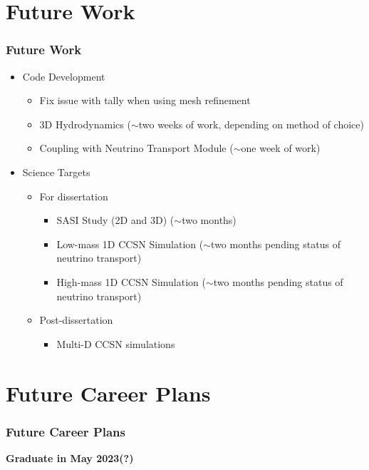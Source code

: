 \documentclass{beamer}
\begin{document}
\section{Future Work}

\begin{frame}
\frametitle{Future Work}

\begin{itemize}
  \item Code Development
  \begin{itemize}
    \item Fix issue with tally when using mesh refinement
    \item 3D Hydrodynamics
          ($\sim$two weeks of work, depending on method of choice)
    \item Coupling with Neutrino Transport Module
          ($\sim$one week of work)
  \end{itemize}
  \item Science Targets
  \begin{itemize}
    \item For dissertation
    \begin{itemize}
      \item SASI Study (2D and 3D) ($\sim$two months)
      \item Low-mass 1D CCSN Simulation
            ($\sim$two months pending status of neutrino transport)
      \item High-mass 1D CCSN Simulation
            ($\sim$two months pending status of neutrino transport)
    \end{itemize}
    \item Post-dissertation
    \begin{itemize}
        \item Multi-D CCSN simulations
    \end{itemize}
\end{itemize}
\end{itemize}

\end{frame}

\section{Future Career Plans}

\begin{frame}
\frametitle{Future Career Plans}

\centering
\textbf{Graduate in May 2023(?)}

\end{frame}
\end{document}
